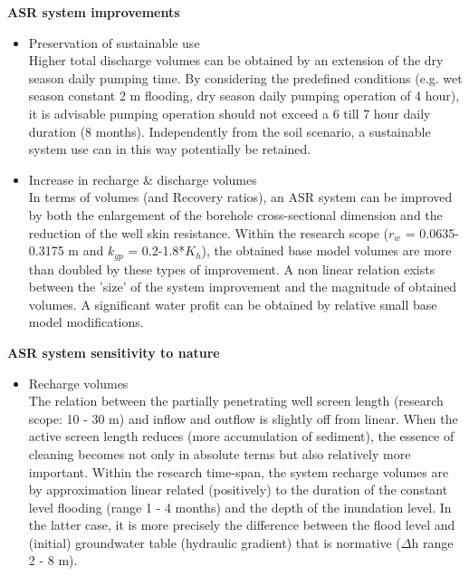 \textbf{ASR system improvements}
\begin{itemize}
\item{Preservation of sustainable use} \\
Higher total discharge volumes can be obtained by an extension of the dry season daily pumping time. By considering the predefined conditions (e.g. wet season constant 2 m flooding, dry season daily pumping operation of 4 hour), it is advisable pumping operation should not exceed a 6 till 7 hour daily duration (8 months). Independently from the soil scenario, a sustainable system use can in this way potentially be retained. 
\item{Increase in recharge \& discharge volumes}\\
In terms of volumes (and Recovery ratios), an ASR system can be improved by both the enlargement of the borehole cross-sectional dimension and the reduction of the well skin resistance. Within the research scope ($r_w$ = 0.0635-0.3175 m and $k_{gp}$ = 0.2-1.8*$K_h$), the obtained base model volumes are more than doubled by these types of improvement. A non linear relation exists between the 'size' of the system improvement and the magnitude of obtained volumes. A significant water profit can be obtained by relative small base model modifications.
\end{itemize}


\textbf{ASR system sensitivity to nature}
\begin{itemize}
\item{Recharge volumes}\\
The relation between the partially penetrating well screen length (research scope: 10 - 30 m) and inflow and outflow is slightly off from linear. When the active screen length reduces (more accumulation of sediment), the essence of cleaning becomes not only in absolute terms but also relatively more important. Within the research time-span, the system recharge volumes are by approximation linear related (positively) to the duration of the constant level flooding (range 1 - 4 months) and the depth of the inundation level. In the latter case, it is more precisely the difference between the flood level and (initial) groundwater table (hydraulic gradient) that is normative ($\Delta$h range 2 - 8 m). 
\end{itemize}

